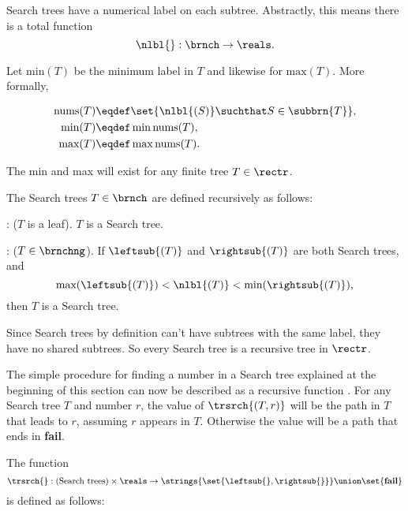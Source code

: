 \begin{definition}
Search trees have a numerical label on each subtree.  Abstractly, this
means there is a total function
\[
\nlbl{}:\brnch \to \reals.
\]

Let $\text{min}(T)$ be the minimum label in $T$ and likewise for
$\text{max}(T)$.  More formally,
\begin{definition}
\begin{align}
\text{nums}(T) & \eqdef \set{\nlbl{(S)} \suchthat S \in \subbrn{T}},\\
\text{min}(T) &\eqdef \min \text{nums}(T), \label{defminT}\\
\text{max}(T) &\eqdef \max \text{nums}(T).\label{defmaxT}
\end{align}
\end{definition}
The min and max will exist for any finite tree $T \in \rectr$.

\begin{definition}\label{defsearchtree}
The Search trees $T \in \brnch$ are defined recursively as follows:

: ($T$ is a leaf).  $T$ is a Search tree.

: ($T \in \brnchng$).
If $\leftsub{(T)}$ and $\rightsub{(T)}$ are both Search trees, and
\[
\text{max}(\leftsub{(T)}) < \nlbl{(T)} < \text{min}(\rightsub{(T)}),
\]
then $T$ is a Search tree.
\end{definition}

Since Search trees by definition can't have subtrees with the same
label, they have no shared subtrees.  So every Search tree is a
recursive tree in $\rectr$.

\iffalse
\begin{definition}\label{defsearchtree}
A recursive tree $T \in \rectr$ is a \term{Search tree} when
\begin{equation}\label{}
\text{max}(\leftsub{(S)}) < \nlbl{(S)} < \text{min}(\rightsub{(S)}).
\end{equation}
for every nonleaf $S \in \subbrn{T}$.
\end{definition}
\fi

The simple procedure for finding a number in a Search tree explained
at the beginning of this section can now be described as a recursive
function \trsrch{}.  For any Search tree $T$ and number $r$, the value
of $\trsrch{(T,r)}$ will be the path in $T$ that leads to $r$,
assuming $r$ appears in $T$.  Otherwise the value will be a path that
ends in \textbf{fail}.

\begin{definition}
The function
\[
\trsrch{}: \text{(Search trees)} \times \reals \to
\strings{\set{\leftsub{},\rightsub{}}} \union \set{\textbf{fail}}
\]
is defined as follows:


\end{definition}
\end{definition}
